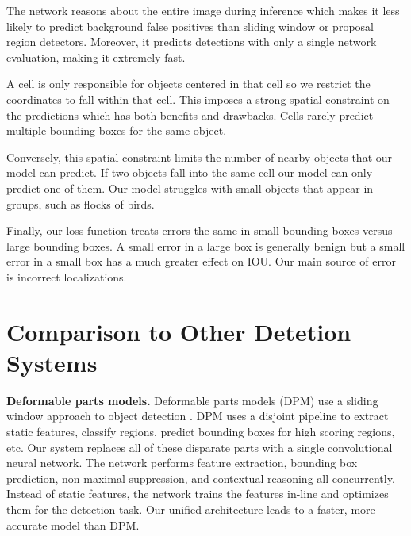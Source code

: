 \documentclass{article} %
\begin{document}
The network reasons about the entire image during inference which makes it less likely to predict background false positives than sliding window or proposal region detectors. Moreover, it predicts detections with only a single network evaluation, making it extremely fast.

A cell is only responsible for objects centered in that cell so we restrict the coordinates to fall within that cell. This imposes a strong spatial constraint on the predictions which has both benefits and drawbacks. Cells rarely predict multiple bounding boxes for the same object.

Conversely, this spatial constraint limits the number of nearby objects that our model can predict. If two objects fall into the same cell our model can only predict one of them. Our model struggles with small objects that appear in groups, such as flocks of birds.

Finally, our loss function treats errors the same in small bounding boxes versus large bounding boxes. A small error in a large box is generally benign but a small error in a small box has a much greater effect on IOU. Our main source of error is incorrect localizations.


\section{Comparison to Other Detetion Systems}

\textbf{Deformable parts models.} Deformable parts models (DPM) use a sliding window approach to object detection \cite{lsvm-pami}. DPM uses a disjoint pipeline to extract static features, classify regions, predict bounding boxes for high scoring regions, etc. Our system replaces all of these disparate parts with a single convolutional neural network. The network performs feature extraction, bounding box prediction, non-maximal suppression, and contextual reasoning all concurrently. Instead of static features, the network trains the features in-line and optimizes them for the detection task. Our unified architecture leads to a faster, more accurate model than DPM.
\end{document}

